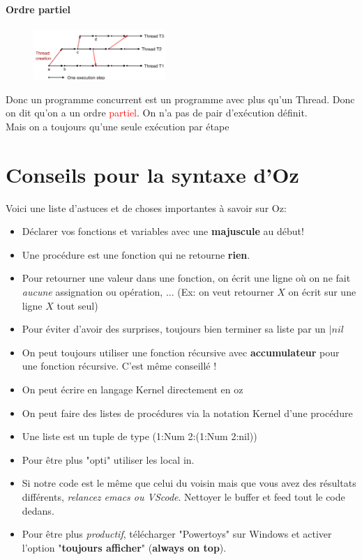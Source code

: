 \documentclass{report}
\begin{document}
\subsubsection{Ordre partiel}
\begin{figure}
\centering
\includegraphics[width=5cm]{img/ordrePartiel.png}
\end{figure}
Donc un programme concurrent est un programme avec plus qu'un Thread. Donc on dit qu'on a un ordre \textcolor{red}{partiel}. On n'a pas de pair d'exécution définit.\\
Mais on a toujours qu'une seule exécution par étape





\chapter{Conseils pour la syntaxe d'Oz}
Voici une liste d'astuces et de choses importantes à savoir sur Oz:
\begin{itemize}
\item Déclarer vos fonctions et variables avec une \textbf{majuscule} au début!
\item Une procédure est une fonction qui ne retourne \textbf{rien}.
\item Pour retourner une valeur dans une fonction, on écrit une ligne où on ne fait \textit{aucune} assignation ou opération, ... (Ex: on veut retourner $X$ on écrit sur une ligne $X$ tout seul)
\item Pour éviter d'avoir des surprises, toujours bien terminer sa liste par un $| nil$
\item On peut toujours utiliser une fonction récursive avec \textbf{accumulateur} pour une fonction récursive. C'est même conseillé !
\item On peut écrire en langage Kernel directement en oz
\item On peut faire des listes de procédures via la notation Kernel d'une procédure
\item Une liste est un tuple de type (1:Num 2:(1:Num 2:nil))
\item Pour être plus "opti" utiliser les local in.
\item Si notre code est le même que celui du voisin mais que vous avez des résultats différents, \textit{relancez emacs ou VScode}. Nettoyer le buffer et feed tout le code dedans.
\item Pour être plus \textit{productif}, télécharger "Powertoys" sur Windows et activer l'option "\textbf{toujours afficher}" (\textbf{always on top}).
\end{itemize}
\end{document}
